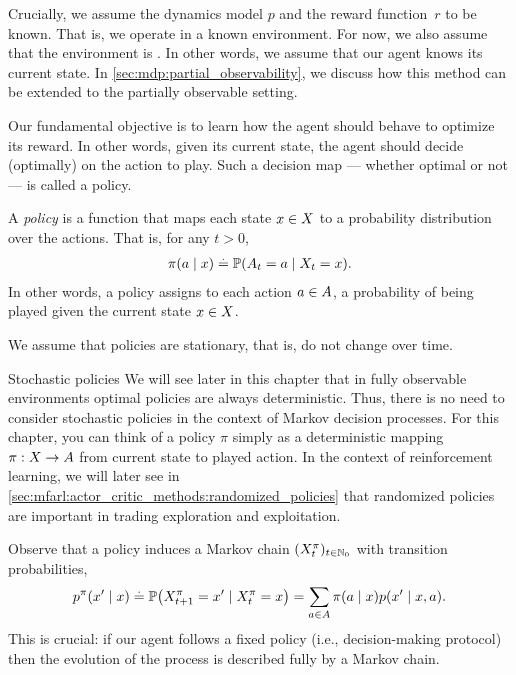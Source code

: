 Crucially, we assume the dynamics model $p$ and the reward function~$r$ to be known.
That is, we operate in a known environment.
For now, we also assume that the environment is .
In other words, we assume that our agent knows its current state.
In \cref{sec:mdp:partial_observability}, we discuss how this method can be extended to the partially observable setting.

Our fundamental objective is to learn how the agent should behave to optimize its reward.
In other words, given its current state, the agent should decide (optimally) on the action to play.
Such a decision map --- whether optimal or not --- is called a policy.

\begin{defn}[Policy]
  A \emph{policy} is a function that maps each state $x \in X$ to a probability distribution over the actions. That is, for any ${t > 0}$, \begin{align}
    \pi(a \mid x) \defeq \Pr{A_t = a \mid X_t = x}.
  \end{align}
  In other words, a policy assigns to each action $a \in A$, a probability of being played given the current state $x \in X$.
\end{defn}

We assume that policies are stationary, that is, do not change over time.

\begin{rmk}{Stochastic policies}{}
  We will see later in this chapter that in fully observable environments optimal policies are always deterministic.
  Thus, there is no need to consider stochastic policies in the context of Markov decision processes.
  For this chapter, you can think of a policy $\pi$ simply as a deterministic mapping $\pi : X \to A$ from current state to played action.
  In the context of reinforcement learning, we will later see in \cref{sec:mfarl:actor_critic_methods:randomized_policies} that randomized policies are important in trading exploration and exploitation.
\end{rmk}

Observe that a policy induces a Markov chain $(X_t^\pi)_{t\in\mathbb{N}_0}$ with transition probabilities, \begin{align}
  p^\pi(x' \mid x) \defeq \Pr{X_{t+1}^\pi = x' \mid X_t^\pi = x} = \sum_{a \in \sA} \pi(a \mid x) p(x' \mid x, a).
\end{align}
This is crucial: if our agent follows a fixed policy (i.e., decision-making protocol) then the evolution of the process is described fully by a Markov chain.


